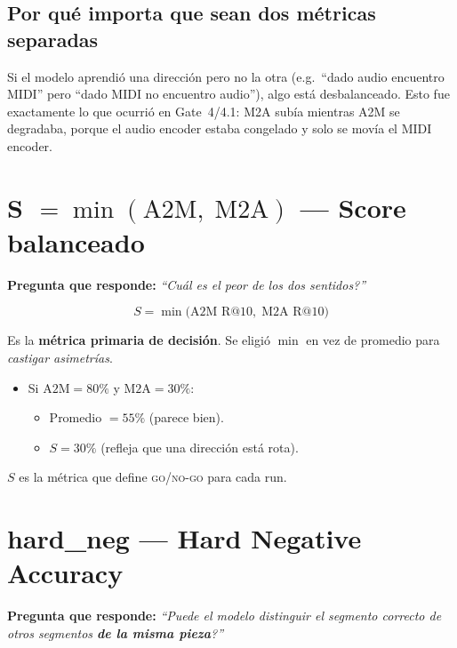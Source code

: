 \documentclass[11pt,a4paper]{article}
\newcommand{\metrica}[1]{\textbf{\textsf{#1}}}
\begin{document}
\subsection*{Por qu\'e importa que sean dos m\'etricas separadas}

Si el modelo aprendi\'o una direcci\'on pero no la otra
(e.g.\ ``dado audio encuentro MIDI'' pero ``dado MIDI no encuentro audio''),
algo est\'a desbalanceado.
Esto fue exactamente lo que ocurri\'o en Gate~4/4.1:
M2A sub\'ia mientras A2M se degradaba,
porque el audio encoder estaba congelado
y solo se mov\'ia el MIDI encoder.

\section{\metrica{S} $= \min(\text{A2M},\;\text{M2A})$ --- Score balanceado}

\textbf{Pregunta que responde:}
\emph{``\textquestiondown Cu\'al es el peor de los dos sentidos?''}

\[
  \boxed{\;S = \min\!\big(\text{A2M R@10},\;\text{M2A R@10}\big)\;}
\]

Es la \textbf{m\'etrica primaria de decisi\'on}.
Se eligi\'o $\min$ en vez de promedio para \emph{castigar asimetr\'ias}.

\begin{itemize}[nosep]
  \item Si $\text{A2M} = 80\%$ y $\text{M2A} = 30\%$:
    \begin{itemize}[nosep]
      \item Promedio $= 55\%$ \quad (parece bien).
      \item $S = 30\%$ \quad (refleja que una direcci\'on est\'a rota).
    \end{itemize}
\end{itemize}

$S$ es la m\'etrica que define \textsc{go}/\textsc{no-go} para cada run.

\section{\metrica{hard\_neg} --- Hard Negative Accuracy}

\textbf{Pregunta que responde:}
\emph{``\textquestiondown Puede el modelo distinguir el segmento correcto
de otros segmentos \textbf{de la misma pieza}?''}
\end{document}
